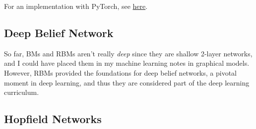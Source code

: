   \begin{algo}[Implementation]
    For an implementation with PyTorch, see \href{code/rbm.html}{here}. 
  \end{algo}

\subsection{Deep Belief Network} 

  So far, BMs and RBMs aren't really \textit{deep} since they are shallow 2-layer networks, and I could have placed them in my machine learning notes in graphical models. However, RBMs provided the foundations for deep belief networks, a pivotal moment in deep learning, and thus they are considered part of the deep learning curriculum. 

\subsection{Hopfield Networks}

